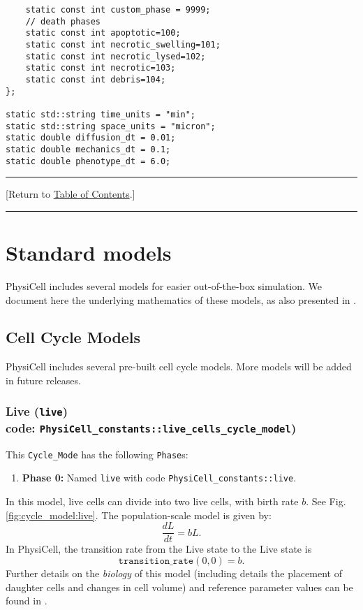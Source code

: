 \documentclass[12pt]{article}
\newcommand{\beq}{\begin{equation}}
\newcommand{\eeq}{\end{equation}}
\renewcommand{\v}{\verb}
\newcommand{\blue}[1]{\textcolor{blue}{#1}}
\newcommand{\DONE}{}%
\newcommand{\TOClink}{\begin{center}\hrule\vskip-10pt\phantom{.}\hfill[Return to \hyperlink{TOC}{Table of Contents}.]\hfill\phantom{.}\vskip3pt\hrule\end{center}}
\begin{document}
\begin{verbatim}
    static const int custom_phase = 9999;
    // death phases
    static const int apoptotic=100;
    static const int necrotic_swelling=101;
    static const int necrotic_lysed=102;
    static const int necrotic=103; 
    static const int debris=104; 
};

static std::string time_units = "min";
static std::string space_units = "micron";
static double diffusion_dt = 0.01; 
static double mechanics_dt = 0.1;
static double phenotype_dt = 6.0;
\end{verbatim}

\TOClink 

\section{Standard models \DONE}
\label{sec:Standard_Models}
PhysiCell includes several models for easier out-of-the-box simulation. 
We document here the underlying mathematics of these models, as also 
presented in \cite{ref:PhysiCell}. 

\subsection{Cell Cycle Models \DONE}
\label{sec:Standard_Models:Cycle}
PhysiCell includes several pre-built cell cycle models. More models 
will be added in future releases. 

\subsubsection{Live (\texttt{live})\\
code: \texttt{PhysiCell\_constants::live\_cells\_cycle\_model})}
\label{sec:Standard_Models:Live}
This \v|Cycle_Mode| has the following \v|Phase|s: 
\begin{enumerate}
\item 
\textbf{Phase 0:} Named \v|live| with code \v|PhysiCell_constants::live|. 
\end{enumerate}
In this model, live cells can divide into two live cells, with 
birth rate $b$. See Fig. \ref{fig:cycle_model:live}. The 
population-scale model is given by: 
\beq
\frac{dL}{dt} = b L. 
\eeq
In PhysiCell, the transition rate 
from the Live state to the Live state is 
\beq
\texttt{transition\_rate}(0,0) = b. 
\eeq
Further details on the \emph{biology} of this model (including 
details the placement of daughter cells and changes in cell 
volume) and reference parameter values can be found in \cite{ref:PhysiCell}. 
\end{document}
